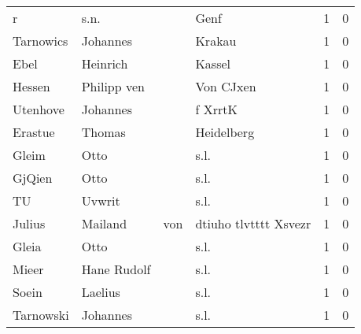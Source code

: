 \documentclass[10pt,a4paper,landscape]{article}
\begin{document}
\begin{longtable}{llllrr}
                        r &                               s.n. &             &                                        Genf &          1 &         0 \\
                Tarnowics &                           Johannes &             &                                      Krakau &          1 &         0 \\
                     Ebel &                           Heinrich &             &                                      Kassel &          1 &         0 \\
                   Hessen &                        Philipp ven &             &                                   Von CJxen &          1 &         0 \\
                 Utenhove &                           Johannes &             &                                     f XrrtK &          1 &         0 \\
                  Erastue &                             Thomas &             &                                  Heidelberg &          1 &         0 \\
                    Gleim &                               Otto &             &                                        s.l. &          1 &         0 \\
                   GjQien &                               Otto &             &                                        s.l. &          1 &         0 \\
                       TU &                             Uvwrit &             &                                        s.l. &          1 &         0 \\
                   Julius &                            Mailand &         von &                       dtiuho tlvtttt Xsvezr &          1 &         0 \\
                    Gleia &                               Otto &             &                                        s.l. &          1 &         0 \\
                    Mieer &                        Hane Rudolf &             &                                        s.l. &          1 &         0 \\
                    Soein &                            Laelius &             &                                        s.l. &          1 &         0 \\
                Tarnowski &                           Johannes &             &                                        s.l. &          1 &         0 \\

\end{longtable}
\end{document}

